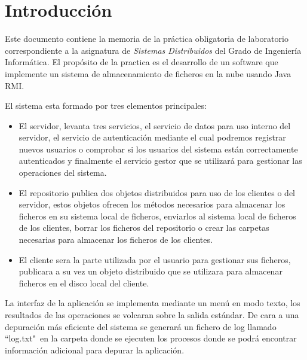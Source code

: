 \chapter{Introducción}

Este documento contiene la memoria de la práctica obligatoria de laboratorio correspondiente a la asignatura de \emph{Sistemas Distribuidos} del Grado de Ingeniería Informática. El propósito de la practica es el desarrollo de un software que implemente un sistema de almacenamiento de ficheros en la nube usando Java RMI.

El sistema esta formado por tres elementos principales:

\begin{itemize}
\item El servidor, levanta tres servicios, el servicio de datos para uso interno del servidor, el servicio de autenticación mediante el cual podremos registrar nuevos usuarios o comprobar si los usuarios del sistema están correctamente autenticados y finalmente el servicio gestor que se utilizará para gestionar las operaciones del sistema.

\item El repositorio publica dos objetos distribuidos para uso de los clientes o del servidor, estos objetos ofrecen los métodos necesarios para almacenar los ficheros en su sistema local de ficheros, enviarlos al sistema local de ficheros de los clientes, borrar los ficheros del repositorio o crear las carpetas necesarias para almacenar los ficheros de los clientes.

\item El cliente sera la parte utilizada por el usuario para gestionar sus ficheros, publicara a su vez un objeto distribuido que se utilizara para almacenar ficheros en el disco local del cliente.
\end{itemize}

La interfaz de la aplicación se implementa mediante un menú en modo texto, los resultados de las operaciones se volcaran sobre la salida estándar. De cara a una depuración más eficiente del sistema se generará un fichero de log llamado ``log.txt"\ en la carpeta donde se ejecuten los procesos donde se podrá encontrar información adicional para depurar la aplicación.